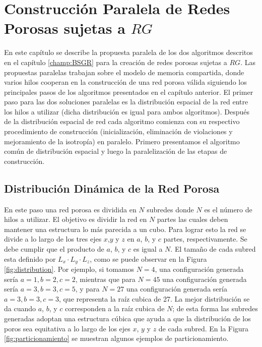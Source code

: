 \chapter[Construcción Paralela]{Construcción Paralela de Redes Porosas sujetas a $RG$}
\label{champ:PBSGR}
\bigskip
\barra
\bigskip
En este capítulo se describe la propuesta paralela de los dos algoritmos descritos en el capítulo \ref{champ:BSGR} para la creación 
de redes porosas sujetas a $RG$. Las propuestas paralelas trabajan sobre el modelo  de memoria compartida,
donde varios hilos cooperan en la construcción de una red porosa válida siguiendo los principales pasos de los algoritmos presentados en el capítulo anterior. El primer paso para las dos soluciones paralelas es la distribución espacial de la red entre los hilos a utilizar 
(dicha distribución es igual para ambos algoritmos). Después de la distribución espacial de red cada algoritmo comienza con su 
respectivo procedimiento de construcción (inicialización, eliminación de violaciones y mejoramiento de la isotropía) en paralelo.
Primero presentamos el algoritmo común de distribución espacial y luego la paralelización de las etapas de construcción.

\section{Distribución Dinámica de la Red Porosa}
\label{sec:pdistribution}
En este paso una red porosa es dividida en $N$ subredes donde $N$ es el número de hilos a utilizar. El objetivo es dividir 
la red en $N$ partes las cuales deben mantener una estructura lo más parecida a un cubo. Para lograr esto la red se divide a lo largo 
de los tres ejes $x$,$y$ y $z$ en $a$, $b$, y $c$ partes, respectivamente. Se debe cumplir que el producto de  $a$, $b$, y $c$ es igual 
a $N$. El tamaño de cada subred esta definido por $L_x \cdot L_y \cdot L_z$, como se puede observar en la Figura \ref{fig:distribution}. 
Por ejemplo, si tomamos $N=4$, una configuración generada sería $a=1,b=2,c=2$, mientras que para $N=45$ una configuración generada 
sería $a=3,b=3,c=5$, y para  $N = 27$ una configuración generada sería $a=3,b=3,c=3$, que representa la raíz cubica de 27. La mejor 
distribución se da cuando $a$, $b$, y $c$ corresponden a la raíz cubica de $N$; de esta forma las subredes generadas adoptan
una estructura cúbica que ayuda a que la distribución de los poros sea equitativa a lo largo de los ejes $x$, $y$ y $z$ de cada subred.
En la Figura \ref{fig:particionamiento} se muestran algunos ejemplos de particionamiento.\\

